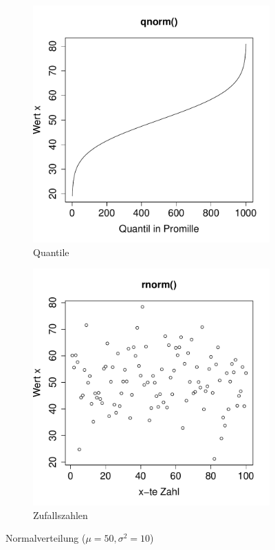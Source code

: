 \begin{figure}[h!]
\begin{subfigure}[b]{0.48\textwidth}
\includegraphics{verteilungen-075}
\caption{Quantile}
\end{subfigure}
\begin{subfigure}[b]{0.48\textwidth}
\includegraphics{verteilungen-076}
\caption{Zufallszahlen}
\end{subfigure}
\caption{Normalverteilung ($\mu=50, \sigma^2=10$)}
\label{fig:norm}
\end{figure}

